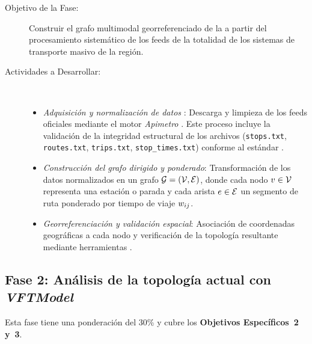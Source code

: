 \begin{description}
    \item[Objetivo de la Fase:] Construir el grafo multimodal georreferenciado de
    la \zmvm{} a partir del procesamiento sistemático de los feeds \gtfs{} de la
    totalidad de los sistemas de transporte masivo de la región.

    \item[Actividades a Desarrollar:]~
    \begin{itemize}
        \item \textit{Adquisición y normalización de datos \gtfs{}}: Descarga y
        limpieza de los feeds oficiales mediante el motor \textit{Apimetro}
        \parencite{cabrera2025apimetro}. Este proceso incluye la validación de la
        integridad estructural de los archivos (\texttt{stops.txt},
        \texttt{routes.txt}, \texttt{trips.txt}, \texttt{stop\_times.txt}) conforme
        al estándar \gtfs{} \parencite{fortin2016innovative}.
        \item \textit{Construcción del grafo dirigido y ponderado}: Transformación
        de los datos normalizados en un grafo $\mathcal{G} = (\mathcal{V}, \mathcal{E})$, donde
        cada nodo $v \in \mathcal{V}$ representa una estación o parada y cada arista
        $e \in \mathcal{E}$ un segmento de ruta ponderado por tiempo de viaje
        $w_{ij}$.
        \item \textit{Georreferenciación y validación espacial}: Asociación de
        coordenadas geográficas a cada nodo y verificación de la topología resultante
        mediante herramientas \gis{}.
    \end{itemize}
\end{description}

\subsection{Fase 2: Análisis de la topología actual con \textit{VFTModel}}
\label{subsec:fase2}

Esta fase tiene una ponderación del 30\% y cubre los \textbf{Objetivos
Específicos~2 y~3}.

